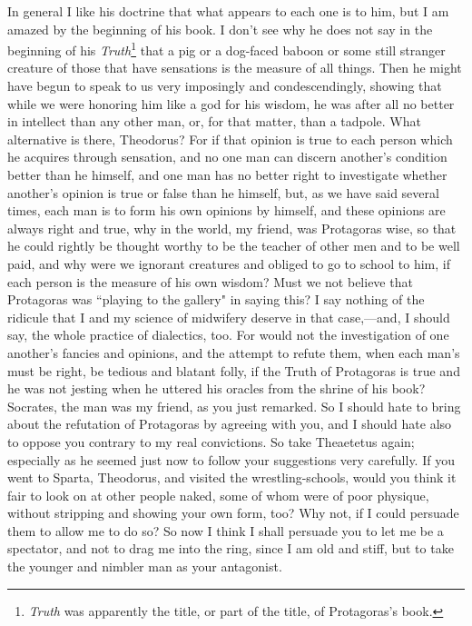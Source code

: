 \documentclass[letterpaper,12pt]{article}
\newcommand{\stephpag}[1]{\marginnote{\small\itshape\fontfamily{ppl}\selectfont #1}}
\begin{document}
\begin{drama}
In general I like his doctrine that what appears to each one is to him, but I am amazed by the beginning of his book. I don't see why he does not say in the beginning of his \emph{Truth}\footnote{\emph{Truth} was apparently the title, or part of the title, of Protagoras's book.} that a pig or a dog-faced baboon or some still stranger creature of those that have sensations is the measure of all things. Then he might have begun to speak to us very imposingly and condescendingly, showing that while we were honoring him like a god for his wisdom, he was after all no better in intellect than any other man, \stephpag{d} or, for that matter, than a tadpole. What alternative is there, Theodorus? For if that opinion is true to each person which he acquires through sensation, and no one man can discern another's condition better than he himself, and one man has no better right to investigate whether another's opinion is true or false than he himself, but, as we have said several times, each man is to form his own opinions by himself, and these opinions are always right and true, why in the world, my friend, was Protagoras wise, so that he could rightly be thought worthy \stephpag{e} to be the teacher of other men and to be well paid, and why were we ignorant creatures and obliged to go to school to him, if each person is the measure of his own wisdom? Must we not believe that Protagoras was ``playing to the gallery" in saying this? I say nothing of the ridicule that I and my science of midwifery deserve in that case,—and, I should say, the whole practice of dialectics, too. For would not the investigation of one another's fancies and opinions, and the attempt to refute them, when each man's must be right, be tedious \stephpag{162 a} and blatant folly, if the Truth of Protagoras is true and he was not jesting when he uttered his oracles from the shrine of his book?
\theodorusspeaks
Socrates, the man was my friend, as you just remarked. So I should hate to bring about the refutation of Protagoras by agreeing with you, and I should hate also to oppose you contrary to my real convictions. So take Theaetetus again; especially as he seemed just now to follow your suggestions very carefully.
\socratesspeaks
If you went to Sparta, Theodorus, \stephpag{b} and visited the wrestling-schools, would you think it fair to look on at other people naked, some of whom were of poor physique, without stripping and showing your own form, too?
\theodorusspeaks
Why not, if I could persuade them to allow me to do so? So now I think I shall persuade you to let me be a spectator, and not to drag me into the ring, since I am old and stiff, but to take the younger and nimbler man as your antagonist.

\end{drama}
\end{document}
